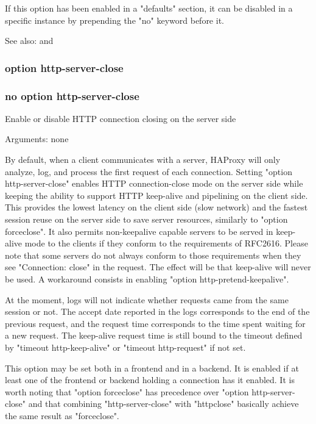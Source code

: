   If this option has been enabled in a "defaults" section, it can be disabled
  in a specific instance by prepending the "no" keyword before it.

  See also:  and 

\subsubsection{option http-server-close}
\subsubsection{no option http-server-close}


  Enable or disable HTTP connection closing on the server side


  Arguments: none

  By default, when a client communicates with a server, HAProxy will only
  analyze, log, and process the first request of each connection. Setting
  "option http-server-close" enables HTTP connection-close mode on the server
  side while keeping the ability to support HTTP keep-alive and pipelining on
  the client side.  This provides the lowest latency on the client side (slow
  network) and the fastest session reuse on the server side to save server
  resources, similarly to "option forceclose". It also permits non-keepalive
  capable servers to be served in keep-alive mode to the clients if they
  conform to the requirements of RFC2616. Please note that some servers do not
  always conform to those requirements when they see "Connection: close" in the
  request. The effect will be that keep-alive will never be used. A workaround
  consists in enabling "option http-pretend-keepalive".

  At the moment, logs will not indicate whether requests came from the same
  session or not. The accept date reported in the logs corresponds to the end
  of the previous request, and the request time corresponds to the time spent
  waiting for a new request. The keep-alive request time is still bound to the
  timeout defined by "timeout http-keep-alive" or "timeout http-request" if
  not set.

  This option may be set both in a frontend and in a backend. It is enabled if
  at least one of the frontend or backend holding a connection has it enabled.
  It is worth noting that "option forceclose" has precedence over "option
  http-server-close" and that combining "http-server-close" with "httpclose"
  basically achieve the same result as "forceclose".

